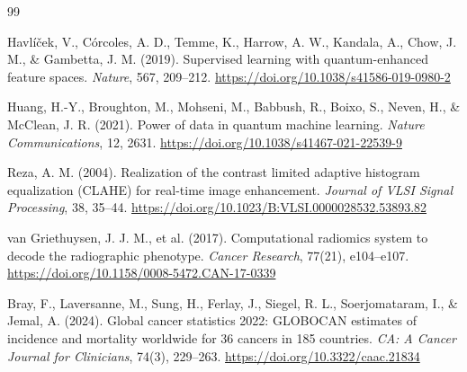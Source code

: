 \begin{thebibliography}{99}

    Havl{\'{i}}{\v{c}}ek, V., C{\'{o}}rcoles, A. D., Temme, K., Harrow, A. W., Kandala, A., Chow, J. M., \& Gambetta, J. M. (2019). Supervised learning with quantum-enhanced feature spaces.
    \textit{Nature}, 567, 209--212.
    \url{https://doi.org/10.1038/s41586-019-0980-2}

    Huang, H.-Y., Broughton, M., Mohseni, M., Babbush, R., Boixo, S., Neven, H., \& McClean, J. R. (2021). Power of data in quantum machine learning.
    \textit{Nature Communications}, 12, 2631.
    \url{https://doi.org/10.1038/s41467-021-22539-9}

    Reza, A. M. (2004). Realization of the contrast limited adaptive histogram equalization (CLAHE) for real-time image enhancement.
    \textit{Journal of VLSI Signal Processing}, 38, 35--44.
    \url{https://doi.org/10.1023/B:VLSI.0000028532.53893.82}

    van Griethuysen, J. J. M., et al. (2017). Computational radiomics system to decode the radiographic phenotype.
    \textit{Cancer Research}, 77(21), e104--e107.
    \url{https://doi.org/10.1158/0008-5472.CAN-17-0339}


    Bray, F., Laversanne, M., Sung, H., Ferlay, J., Siegel, R. L., Soerjomataram, I., \& Jemal, A. (2024).
    Global cancer statistics 2022: GLOBOCAN estimates of incidence and mortality worldwide for 36 cancers in 185 countries.
    \textit{CA: A Cancer Journal for Clinicians}, 74(3), 229--263.
    \url{https://doi.org/10.3322/caac.21834}


\end{thebibliography}
